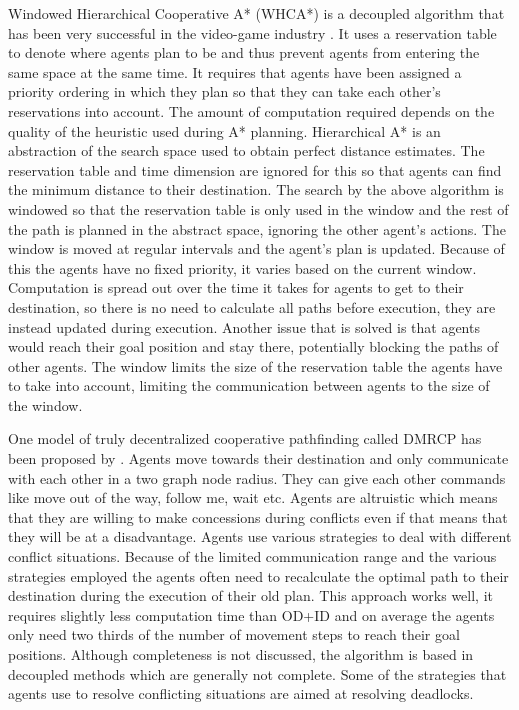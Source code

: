 \documentclass[a4paper]{article}
\begin{document}
Windowed Hierarchical Cooperative A* (WHCA*) is a decoupled algorithm that has
been very successful in the video-game industry \cite{silver2005}. It uses a
reservation table to denote where agents plan to be and thus prevent agents
from entering the same space at the same time. It requires that agents have
been assigned a priority ordering in which they plan so that they can take each
other's reservations into account. The amount of computation required depends
on the quality of the heuristic used during A* planning. Hierarchical A* is an
abstraction of the search space used to obtain perfect distance estimates. The
reservation table and time dimension are ignored for this so that agents can
find the minimum distance to their destination. The search by the above
algorithm is windowed so that the reservation table is only used in the window
and the rest of the path is planned in the abstract space, ignoring the other
agent's actions. The window is moved at regular intervals and the agent's plan
is updated. Because of this the agents have no fixed priority, it varies based
on the current window. Computation is spread out over the time it takes for
agents to get to their destination, so there is no need to calculate all paths
before execution, they are instead updated during execution. Another issue that
is solved is that agents would reach their goal position and stay there,
potentially blocking the paths of other agents. The window limits the size of
the reservation table the agents have to take into account, limiting the
communication between agents to the size of the window.

One model of truly decentralized cooperative pathfinding called DMRCP has been
proposed by
\cite{wei2016}. Agents move towards their destination and only communicate with
each other in a two graph node radius. They can give each other commands like
move out of the way, follow me, wait etc. Agents are altruistic which means
that they are willing to make concessions during conflicts even if that means
that they will be at a disadvantage. Agents use various strategies to deal with
different conflict situations. Because of the limited communication range and
the various strategies employed the agents often need to recalculate the
optimal path to their destination during the execution of their old plan. This
approach works well, it requires slightly less computation time than OD+ID and
on average the agents only need two thirds of the number of movement steps to
reach their goal positions. Although completeness is not discussed, the
algorithm is based in decoupled methods which are generally not complete. Some
of the strategies that agents use to resolve conflicting situations are aimed
at resolving deadlocks.
\end{document}
